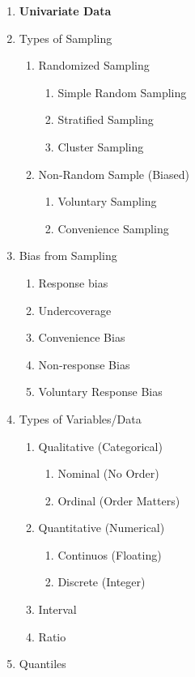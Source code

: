 \documentclass[11pt]{article}
\begin{document}
\begin{enumerate}
	\item \textbf{Univariate Data}
	\item Types of Sampling
	\begin{enumerate}
		\item Randomized Sampling
	 \begin{enumerate}
	 	\item Simple Random Sampling
	 	\item Stratified Sampling 
	 	\item Cluster Sampling
	 \end{enumerate}
       \item Non-Random Sample (Biased)
       \begin{enumerate}
       	\item Voluntary Sampling
       	\item Convenience Sampling
       \end{enumerate}
    \end{enumerate}
\item Bias from Sampling
\begin{enumerate}
	\item Response bias
	\item Undercoverage
	\item Convenience Bias
	\item  Non-response Bias
	\item Voluntary Response Bias
\end{enumerate}
\item Types of Variables/Data
\begin{enumerate}
	\item Qualitative (Categorical)
	\begin{enumerate}
		\item Nominal (No Order)
		\item Ordinal (Order Matters)
	\end{enumerate}
	\item Quantitative (Numerical)
		\begin{enumerate}
		\item Continuos (Floating)
		\item Discrete (Integer)
	\end{enumerate}
\item Interval
\item Ratio
\end{enumerate}
\item Quantiles\\

\end{enumerate}
\end{document}
